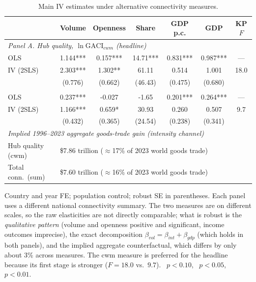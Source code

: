 \begin{table}[t]
\centering
\caption{Main IV estimates under alternative connectivity measures.}
\label{tab:measure}
\begin{threeparttable}
\small
\begin{tabular}{lcccccc}
\toprule
 & Volume & Openness & Share & GDP p.c. & GDP & KP $F$ \\
\midrule
\multicolumn{7}{l}{\emph{Panel A. Hub quality, $\ln\mathrm{GACI}_{cwm}$ (headline)}}\\
OLS & 1.144*** & 0.157*** & 14.71*** & 0.831*** & 0.987*** & --- \\
IV (2SLS) & 2.303*** & 1.302** & 61.11 & 0.514 & 1.001 & 18.0 \\
 & (0.776) & (0.662) & (46.43) & (0.475) & (0.680) & \\
\addlinespace
\multicolumn{7}{l}{\emph{Panel B. Total connectivity, $\ln\mathrm{GACI}_{sum}$}}\\
OLS & 0.237*** & -0.027 & -1.65 & 0.201*** & 0.264*** & --- \\
IV (2SLS) & 1.166*** & 0.659* & 30.93 & 0.260 & 0.507 & 9.7 \\
 & (0.432) & (0.365) & (24.54) & (0.238) & (0.341) & \\
\midrule
\multicolumn{7}{l}{\emph{Implied 1996--2023 aggregate goods-trade gain (intensity channel)}}\\
Hub quality (cwm) & \multicolumn{6}{l}{\$7.86 trillion ($\approx$17\% of 2023 world goods trade)} \\
Total conn.\ (sum) & \multicolumn{6}{l}{\$7.60 trillion ($\approx$16\% of 2023 world goods trade)} \\
\bottomrule
\end{tabular}
\begin{tablenotes}\footnotesize
\item Country and year FE; population control; robust SE in parentheses. Each panel uses a different national connectivity summary. The two measures are on different scales, so the raw elasticities are not directly comparable; what is robust is the \emph{qualitative pattern} (volume and openness positive and significant, income outcomes imprecise), the exact decomposition $\beta_{vol}=\beta_{int}+\beta_{gdp}$ (which holds in both panels), and the implied aggregate counterfactual, which differs by only about 3\% across measures. The cwm measure is preferred for the headline because its first stage is stronger ($F=18.0$ vs.\ $9.7$). \sym{*}~$p<0.10$, \sym{**}~$p<0.05$, \sym{***}~$p<0.01$.
\end{tablenotes}
\end{threeparttable}
\end{table}